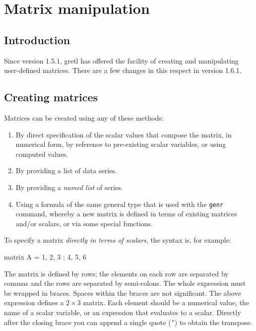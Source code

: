 \chapter{Matrix manipulation}
\label{chap:matrices}

\section{Introduction}
\label{matrix-intro}

Since version 1.5.1, gretl has offered the facility of creating and
manipulating user-defined matrices.  There are a few changes in this
respect in version 1.6.1.

\section{Creating matrices}
\label{matrix-create}

Matrices can be created using any of these methods:

\begin{enumerate}
\item By direct specification of the scalar values that compose the
  matrix, in numerical form, by reference to pre-existing
  scalar variables, or using computed values.
\item By providing a list of data series.
\item By providing a \textit{named list} of series.
\item Using a formula of the same general type that is used
  with the \texttt{genr} command, whereby a new matrix is defined
  in terms of existing matrices and/or scalars, or via some
  special functions.
\end{enumerate}

To specify a matrix \textit{directly in terms of scalars}, the syntax
is, for example:

\begin{code}
matrix A = { 1, 2, 3 ; 4, 5, 6 }
\end{code}

The matrix is defined by rows; the elements on each row are separated
by commas and the rows are separated by semi-colons.  The whole
expression must be wrapped in braces.  Spaces within the braces are
not significant.  The above expression defines a $2\times3$ matrix.
Each element should be a numerical value, the name of a scalar
variable, or an expression that evaluates to a scalar.  Directly after
the closing brace you can append a single quote (\texttt{'}) to obtain
the transpose.


